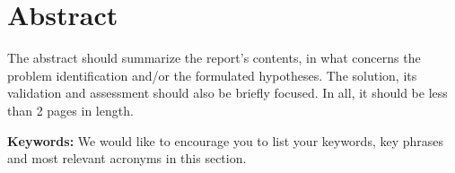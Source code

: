 \chapter*{Abstract}

The abstract should summarize the report’s contents, in what concerns the problem identification and/or the formulated hypotheses. The solution, its validation and assessment should also be briefly focused. In all, it should be less than 2 pages in length.

\textbf{Keywords:} We would like to encourage you to list your keywords, key phrases and most relevant acronyms in this section.


